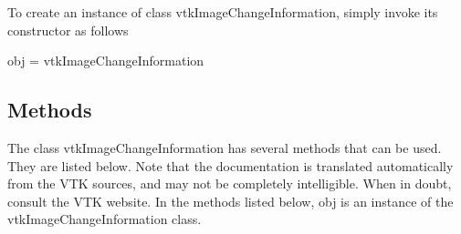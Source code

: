To create an instance of class vtk\-Image\-Change\-Information, simply invoke its constructor as follows \begin{DoxyVerb}  obj = vtkImageChangeInformation
\end{DoxyVerb}
 \hypertarget{vtkwidgets_vtkxyplotwidget_Methods}{}\subsection{Methods}\label{vtkwidgets_vtkxyplotwidget_Methods}
The class vtk\-Image\-Change\-Information has several methods that can be used. They are listed below. Note that the documentation is translated automatically from the V\-T\-K sources, and may not be completely intelligible. When in doubt, consult the V\-T\-K website. In the methods listed below, {\ttfamily obj} is an instance of the vtk\-Image\-Change\-Information class. 
